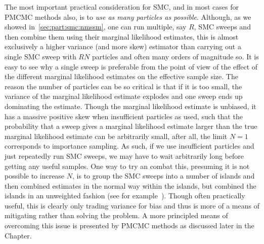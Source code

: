 The most important practical consideration for SMC, and in most cases for PMCMC methods also, is to
\emph{use as many particles as possible}.  Although, as we showed in~\ref{sec:part:smc:nmssm},
one can run multiple, say $R$, SMC sweeps and then combine them using their marginal likelihood estimates, this
is almost exclusively a higher variance (and more skew) estimator than carrying out a single SMC sweep
with $RN$ particles and often many orders of magnitude so.  It is easy to see why a single sweep is preferable
from the point of view of the effect of the different marginal likelihood estimates on the effective sample size.
The reason the number of particles can be so critical is that if it is too small, the variance of the marginal likelihood
estimate explodes and one sweep ends up dominating the estimate.  Though the marginal likelihood estimate is
unbiased, it has a massive positive skew when insufficient particles as used, such that the probability that a
sweep gives a marginal likelihood estimate larger than the true marginal likelihood estimate can be arbitrarily small,
after all, the limit $N=1$ corresponds to importance sampling.  As such, if we use insufficient particles and just
repeatedly run SMC sweeps, we may have to wait arbitrarily long before getting any useful samples.  One way 
to try an combat this, presuming it is not possible to increase $N$, is to group the SMC sweeps into a number
of islands and then combined estimates in the normal way within the islands, but combined the islands in
an unweighted fashion (see for example~\cite{lakshminarayanan2013top}).  Though often practically useful, this
is clearly only trading variance for bias and thus is more of a means of mitigating rather than solving the problem.
A more principled means of overcoming this issue is presented by PMCMC methods as discussed later in the Chapter.

